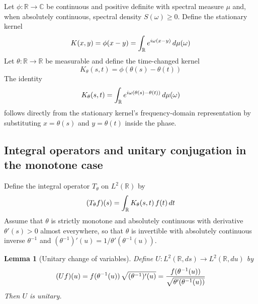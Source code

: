 \documentclass{article}
\newtheorem{lemma}{Lemma}
\begin{document}
Let $\phi : \mathbb{R} \to \mathbb{C}$ be continuous and positive definite
with spectral measure $\mu$ and, when absolutely continuous, spectral density
$S (\omega) \ge 0$. Define the stationary kernel
\begin{equation}
  K (x, y) = \phi (x - y) = \int_{\mathbb{R}} e^{i \omega (x - y)} 
  \hspace{0.17em} d \mu (\omega)
\end{equation}
Let $\theta : \mathbb{R} \to \mathbb{R}$ be measurable and define the
time-changed kernel
\begin{equation}
  K_{\theta} (s, t) = \phi (\theta (s) - \theta (t))
\end{equation}
The identity
\begin{equation}
  K_{\theta} (s, t) = \int_{\mathbb{R}} e^{i \omega (\theta (s) - \theta (t))}
  \hspace{0.17em} d \mu (\omega)
\end{equation}
follows directly from the stationary kernel's frequency-domain representation
by substituting $x = \theta (s)$ and $y = \theta (t)$ inside the phase.

\subsection{Integral operators and unitary conjugation in the monotone case}

Define the integral operator $T_{\theta}$ on $L^2 (\mathbb{R})$ by
\begin{equation}
  (T_{\theta} f) (s) = \int_{\mathbb{R}} K_{\theta} (s, t)  \hspace{0.17em} f
  (t)  \hspace{0.17em} dt
\end{equation}
Assume that $\theta$ is strictly monotone and absolutely continuous with
derivative $\theta' (s) > 0$ almost everywhere, so that $\theta$ is invertible
with absolutely continuous inverse $\theta^{- 1}$ and $(\theta^{- 1})' (u) = 1
/ \theta' (\theta^{- 1} (u))$.

\begin{lemma}
  [Unitary change of variables] Define $U : L^2 (\mathbb{R}, ds) \to L^2
  (\mathbb{R}, du)$ by
  \begin{equation}
    (Uf) (u) = f (\theta^{- 1} (u)) \hspace{0.17em} \sqrt{(\theta^{- 1})' (u)}
    = \frac{f (\theta^{- 1} (u))}{\sqrt{\theta' (\theta^{- 1} (u))}}
  \end{equation}
  Then $U$ is unitary.
\end{lemma}
\end{document}
